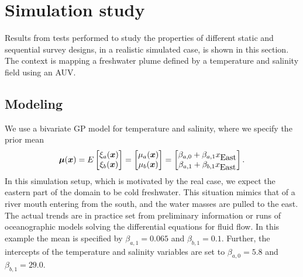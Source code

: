 \documentclass[aoas]{imsart}
\begin{document}
\section{Simulation study}\label{sec:simulations}

Results from tests performed to study the properties of different static and sequential survey designs, in a realistic simulated case, is shown in this section. The context is mapping a freshwater plume defined by a temperature and salinity field using an AUV. 

\subsection{Modeling}

We use a bivariate GP model for temperature and salinity, where we specify the prior mean 
\begin{equation}\label{m}
    \bmu(\bx)=E 
    \begin{bmatrix}
    \xi_a(\bx) \\
    \xi_b(\bx) 
    \end{bmatrix}=\begin{bmatrix} \mu_{a}(\bx)\\
\mu_{b}(\bx)
\end{bmatrix} 
= \begin{bmatrix} \beta_{a,0} + \beta_{a,1} x_{\mbox{East}} \\
\beta_{a,1} + \beta_{b,1} x_{\mbox{East}}
\end{bmatrix}.
\end{equation}
In this simulation setup, which is motivated by the real case, we expect the eastern part of the domain to be cold freshwater. This situation mimics that of a river mouth entering from the south, and the water masses are pulled to the east. The actual trends are in practice set from preliminary information or runs of oceanographic models solving the differential equations for fluid flow. In this example the mean is specified by $\beta_{a,1}=0.065$ and $\beta_{b,1}=0.1$. Further, the intercepts of the temperature and salinity variables are set to $\beta_{a,0}=5.8$ and $\beta_{b,1}=29.0$. 

\end{document}
